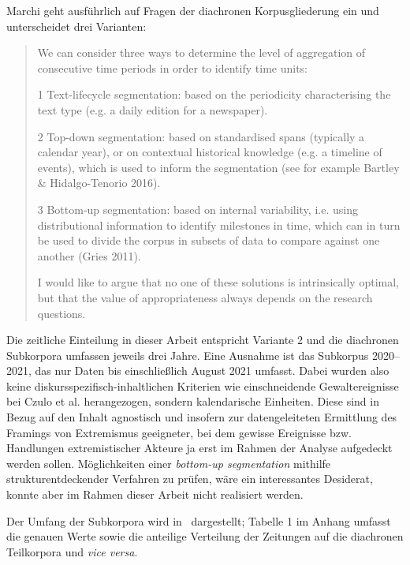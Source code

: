 Marchi geht ausführlich auf Fragen der diachronen Korpusgliederung ein und unterscheidet drei Varianten:

\begin{quote}
We can consider three ways to determine the level of aggregation of consecutive time periods in order to identify time units:

1 Text-lifecycle segmentation: based on the periodicity characterising the text type (e.g. a daily edition for a newspaper).

2 Top-down segmentation: based on standardised spans (typically a calendar year), or on contextual historical knowledge (e.g. a timeline of events), which is used to inform the segmentation (see for example Bartley \& Hidalgo-Tenorio 2016).

3 Bottom-up segmentation: based on internal variability, i.e. using distributional information to identify milestones in time, which can in turn be used to divide the corpus in subsets of data to compare against one another (Gries 2011).

I would like to argue that no one of these solutions is intrinsically optimal, but that the value of appropriateness always depends on the research questions. \autocite[179-180]{marchiDividingDataEpistemological2018}
\end{quote}

Die zeitliche Einteilung in dieser Arbeit entspricht Variante 2 und die diachronen Subkorpora umfassen jeweils drei Jahre. Eine Ausnahme ist das Subkorpus 2020--2021, das nur Daten bis einschließlich August 2021 umfasst. Dabei wurden also keine diskursspezifisch-inhaltlichen Kriterien wie einschneidende Gewaltereignisse bei Czulo et al. \autocite*{czuloEinflussExtremistischerGewaltereignisse2020} herangezogen, sondern kalendarische Einheiten. Diese sind in Bezug auf den Inhalt agnostisch und insofern zur datengeleiteten Ermittlung des Framings von Extremismus geeigneter, bei dem gewisse Ereignisse bzw. Handlungen extremistischer Akteure ja erst im Rahmen der Analyse aufgedeckt werden sollen. Möglichkeiten einer \emph{bottom-up segmentation} mithilfe strukturentdeckender Verfahren zu prüfen, wäre ein interessantes Desiderat, konnte aber im Rahmen dieser Arbeit nicht realisiert werden.

Der Umfang der Subkorpora wird in~ dargestellt; Tabelle 1 im Anhang umfasst die genauen Werte sowie die anteilige Verteilung der Zeitungen auf die diachronen Teilkorpora und \emph{vice versa}.

